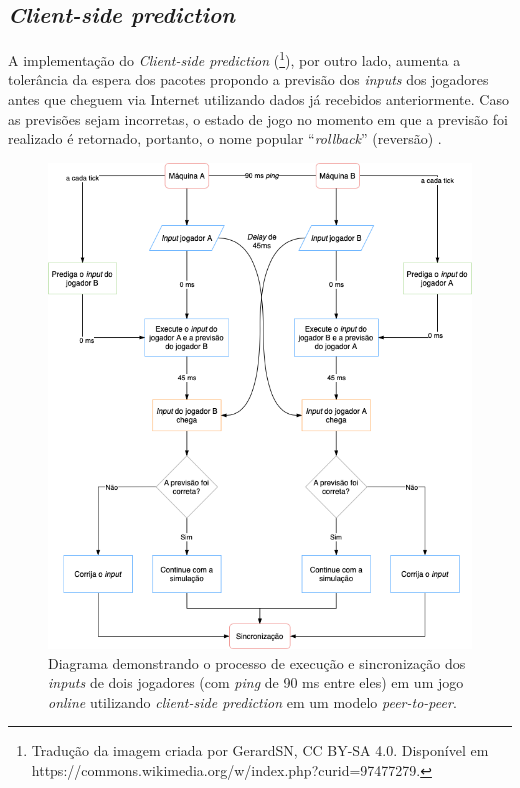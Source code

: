 \subsection{\textit{Client-side prediction}}

A implementação do \textit{Client-side prediction} (\footnote{Tradução da imagem criada por GerardSN, CC BY-SA 4.0. Disponível em https://commons.wikimedia.org/w/index.php?curid=97477279.}), por outro lado, aumenta a tolerância da espera dos pacotes propondo a previsão dos \textit{inputs} dos jogadores antes que cheguem via Internet utilizando dados já recebidos anteriormente. Caso as previsões sejam incorretas, o estado de jogo no momento em que a previsão foi realizado é retornado, portanto, o nome popular ``\textit{rollback}'' (reversão) \cite{rollback}.

\begin{figure}[htbp]
\centering
\includegraphics[width=1\textwidth]{images/rollback.png}
\caption{Diagrama demonstrando o processo de execução e sincronização dos \textit{inputs} de dois jogadores (com \textit{ping} de 90 ms entre eles) em um jogo \textit{online} utilizando \textit{client-side prediction} em um modelo \textit{peer-to-peer}.}
\label{fig:rollback_diagram}
\end{figure}


